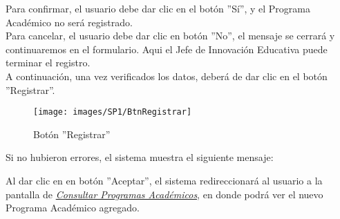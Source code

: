         Para confirmar, el usuario debe dar clic en el botón ''Sí'', y el Programa Académico no será registrado.\\

        Para cancelar, el usuario debe dar clic en botón ''No'', el mensaje se cerrará y continuaremos en el formulario. Aqui el Jefe de Innovación Educativa puede terminar el registro.\\

        A continuación, una vez verificados los datos, deberá de dar clic en el botón ''Registrar''.
        \begin{figure}[!hbtp]
            \centering
            \hypertarget{btnreg}{\texttt{[image: images/SP1/BtnRegistrar]}}
            \caption{Botón ''Registrar''}
            \label{btnreg}
        \end{figure}

        Si no hubieron errores, el sistema muestra el siguiente mensaje:

        Al dar clic en en botón ''Aceptar'', el sistema redireccionará al usuario a la pantalla de \hyperlink{consultarpa}{\textit{Consultar Programas Académicos}}, en donde podrá ver el nuevo Programa Académico agregado.\\

